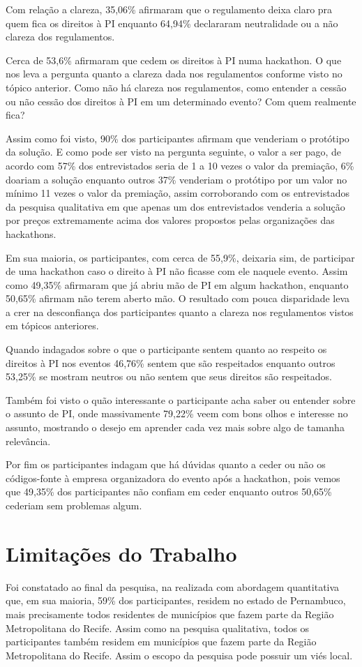 Com relação a clareza, 35,06\% afirmaram que o regulamento deixa claro pra quem fica os direitos à PI enquanto 64,94\% declararam neutralidade ou a não clareza dos regulamentos.

Cerca de 53,6\% afirmaram que cedem os direitos à PI numa hackathon. O que nos leva a pergunta quanto a clareza dada nos regulamentos conforme visto no tópico anterior. Como não há clareza nos regulamentos, como entender a cessão ou não cessão dos direitos à PI em um determinado evento? Com quem realmente fica? 

Assim como foi visto, 90\% dos participantes afirmam que venderiam o protótipo da solução. E como pode ser visto na pergunta seguinte, o valor a ser pago, de acordo com 57\% dos entrevistados seria de 1 a 10 vezes o valor da premiação, 6\% doariam a solução enquanto outros 37\% venderiam o protótipo por um valor no mínimo 11 vezes o valor da premiação, assim corroborando com os entrevistados da pesquisa qualitativa em que apenas um dos entrevistados venderia a solução por preços extremamente acima dos valores propostos pelas organizações das hackathons.

Em sua maioria, os participantes, com cerca de 55,9\%, deixaria sim, de participar de uma hackathon caso o direito à PI não ficasse com ele naquele evento. Assim como 49,35\% afirmaram que já abriu mão de PI em algum hackathon, enquanto 50,65\% afirmam não terem aberto mão. O resultado com pouca disparidade leva a crer na desconfiança dos participantes quanto a clareza nos regulamentos vistos em tópicos anteriores.

Quando indagados sobre o que o participante sentem quanto ao respeito os direitos à PI nos eventos 46,76\% sentem que são respeitados enquanto outros 53,25\% se mostram neutros ou não sentem que seus direitos são respeitados.

Também foi visto o quão interessante o participante acha saber ou entender sobre o assunto de PI, onde massivamente 79,22\% veem com bons olhos e interesse no assunto, mostrando o desejo em aprender cada vez mais sobre algo de tamanha relevância. 

Por fim os participantes indagam que há dúvidas quanto a ceder ou não os códigos-fonte à empresa organizadora do evento após a hackathon, pois vemos que 49,35\% dos participantes não confiam em ceder enquanto outros 50,65\% cederiam sem problemas algum.


\section{Limitações do Trabalho}

Foi constatado ao final da pesquisa, na realizada com abordagem quantitativa que, em sua maioria, 59\% dos participantes, residem no estado de Pernambuco, mais precisamente todos residentes de municípios que fazem parte da Região Metropolitana do Recife. Assim como na pesquisa qualitativa, todos os participantes também residem em municípios que fazem parte da Região Metropolitana do Recife. Assim o escopo da pesquisa pode possuir um viés local.
